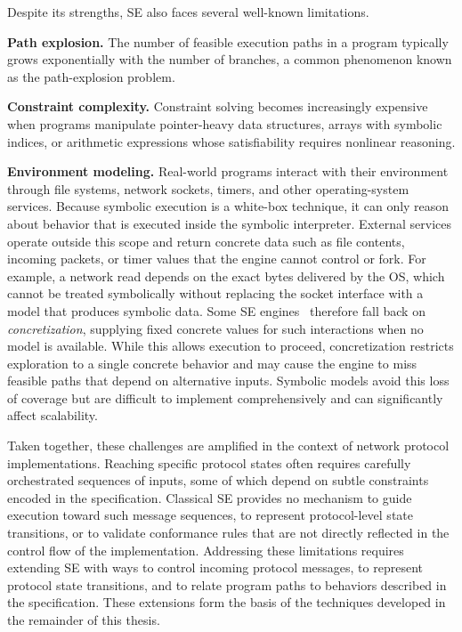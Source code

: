 Despite its strengths, SE also faces several well-known limitations.

\textbf{Path explosion.} The number of feasible execution paths in a program typically grows exponentially with the number of branches, a common phenomenon known as the path-explosion problem.

\textbf{Constraint complexity.} Constraint solving becomes increasingly expensive when programs manipulate pointer-heavy data structures, arrays with symbolic indices, or arithmetic expressions whose satisfiability requires nonlinear reasoning.

\textbf{Environment modeling.} Real-world programs interact with their environment through file systems, network sockets, timers, and other operating-system services. 
Because symbolic execution is a white-box technique, it can only reason about behavior that is executed inside the symbolic interpreter. 
External services operate outside this scope and return concrete data such as file contents, incoming packets, or timer values that the engine cannot control or fork. 
For example, a network read depends on the exact bytes delivered by the OS, which cannot be treated symbolically without replacing the socket interface with a model that produces symbolic data. 
Some SE engines~\cite{KLEE@OSDI-08} therefore fall back on \emph{concretization}, supplying fixed concrete values for such interactions when no model is available. 
While this allows execution to proceed, concretization restricts exploration to a single concrete behavior and may cause the engine to miss feasible paths that depend on alternative inputs. 
Symbolic models avoid this loss of coverage but are difficult to implement comprehensively and can significantly affect scalability.

Taken together, these challenges are amplified in the context of network protocol implementations.
Reaching specific protocol states often requires carefully orchestrated sequences of inputs, some of which depend on subtle constraints encoded in the specification.
Classical SE provides no mechanism to guide execution toward such message sequences, to represent protocol-level state transitions, or to validate conformance rules that are not directly reflected in the control flow of the implementation.
Addressing these limitations requires extending SE with ways to control incoming protocol messages, to represent protocol state transitions, and to relate program paths to behaviors described in the specification.
These extensions form the basis of the techniques developed in the remainder of this thesis.

